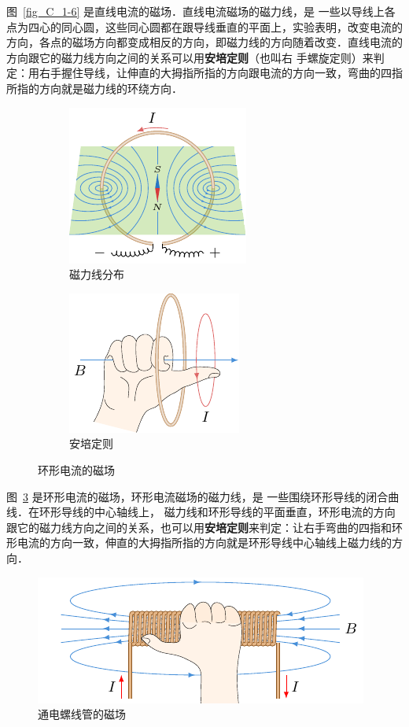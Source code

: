 图~\ref{fig_C_1-6} 是直线电流的磁场．直线电流磁场的磁力线，是
一些以导线上各点为四心的同心圆，这些同心圆都在跟导线垂直的平面上，实验表明，改变电流的方向，各点的磁场方向都变成相反的方向，即磁力线的方向随着改变．直线电流的方向跟它的磁力线方向之间的关系可以用\textbf{安培定则}（也叫右
手螺旋定则）来判定：用右手握住导线，让伸直的大拇指所指的方向跟电流的方向一致，弯曲的四指所指的方向就是磁力线的环绕方向．

\begin{figure}[htbp]
    \centering
    \begin{subfigure}{0.4\linewidth}
        \centering
        \includegraphics{fig/C/1-7a.pdf}
        \caption{磁力线分布}\label{fig_C_1-7a}
    \end{subfigure}
    \hfil
    \begin{subfigure}{0.4\linewidth}
        \centering
        \includegraphics{fig/C/1-7b.pdf}
        \caption{安培定则}\label{fig_C_1-7b}
    \end{subfigure}
    \caption{环形电流的磁场}\label{fig_C_1-7}
\end{figure}

图~\ref{fig_C_1-7} 是环形电流的磁场，环形电流磁场的磁力线，是
一些围绕环形导线的闭合曲线．在环形导线的中心轴线上，
磁力线和环形导线的平面垂直，环形电流的方向跟它的磁力线方向之间的关系，也可以用\textbf{安培定则}来判定：让右手弯曲的四指和环形电流的方向一致，伸直的大拇指所指的方向就是环形导线中心轴线上磁力线的方向．

\begin{figure}[htbp]
    \centering
    \includegraphics{fig/C/1-8.pdf}
    \caption{通电螺线管的磁场}\label{fig_C_1-8}
\end{figure}

